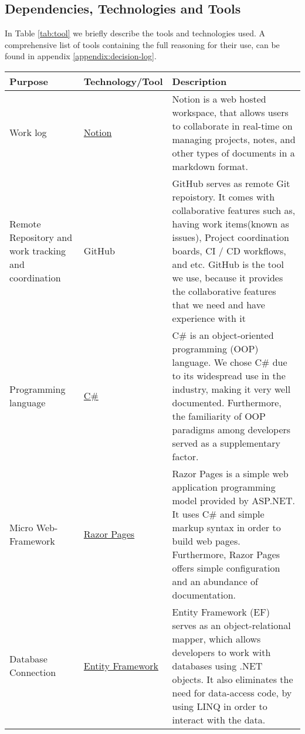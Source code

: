 
\subsection{Dependencies, Technologies and Tools}


In Table \ref{tab:tool} we briefly describe the tools and technologies used. A comprehensive list of tools containing the full reasoning for their use, can be found in appendix \ref{appendix:decision-log}.

\begin{longtable}{|p{}|p{} | p{}|}
    \hline
    \textbf{Purpose} & \textbf{Technology/Tool} & \textbf{Description}\\
    \hline
    Work log & \href{https://www.notion.so/help/guides/category/documentation}{Notion} & Notion is a web hosted workspace, that allows users to collaborate in real-time on managing projects, notes, and other types of documents in a markdown format.\\
    \hline
    Remote Repository and work tracking and coordination & GitHub & GitHub serves as remote Git repoistory. It comes with collaborative features such as, having work items(known as issues), Project coordination boards, CI / CD workflows, and etc. GitHub is the tool we use, because it provides the collaborative features that we need and have experience with it\\
    \hline
    Programming language & \href{https://learn.microsoft.com/en-us/dotnet/csharp/}{C\#} &
    C\# is an object-oriented programming (OOP) language. We chose C\# due to its widespread use in the industry, making it very well documented. Furthermore, the familiarity of OOP paradigms among developers served as a supplementary factor.\\
    \hline
    Micro Web-Framework & \href{https://learn.microsoft.com/en-us/aspnet/core/razor-pages/?view=aspnetcore-8.0&tabs=visual-studio}{Razor Pages} & Razor Pages is a simple web application programming model provided by ASP.NET. It uses C\# and simple markup syntax in order to build web pages. Furthermore, Razor Pages offers simple configuration and an abundance of documentation.\\
    \hline
    Database Connection & \href{https://learn.microsoft.com/en-us/ef/core/}{Entity Framework} & Entity Framework (EF) serves as an object-relational mapper, which allows developers to work with databases using .NET objects. It also eliminates the need for data-access code, by using LINQ in order to interact with the data.\\

\end{longtable}
